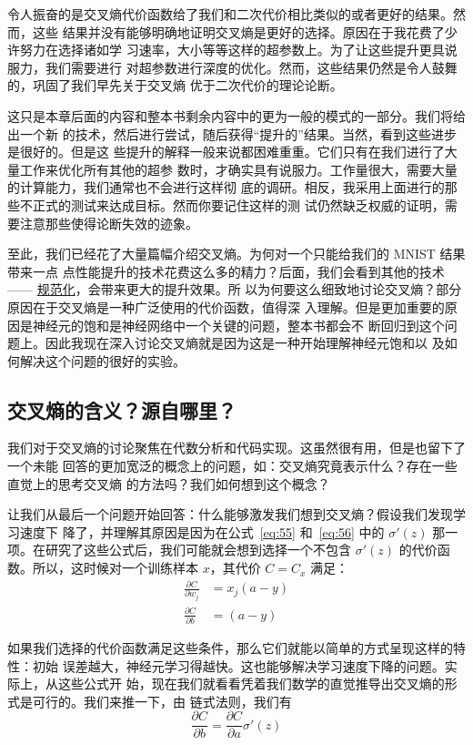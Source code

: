 令人振奋的是交叉熵代价函数给了我们和二次代价相比类似的或者更好的结果。然而，这些
结果并没有能够明确地证明交叉熵是更好的选择。原因在于我花费了少许努力在选择诸如学
习速率，\minibatch{}大小等等这样的超参数上。为了让这些提升更具说服力，我们需要进行
对超参数进行深度的优化。然而，这些结果仍然是令人鼓舞的，巩固了我们早先关于交叉熵
优于二次代价的理论论断。

这只是本章后面的内容和整本书剩余内容中的更为一般的模式的一部分。我们将给出一个新
的技术，然后进行尝试，随后获得“提升的”结果。当然，看到这些进步是很好的。但是这
些提升的解释一般来说都困难重重。它们只有在我们进行了大量工作来优化所有其他的超参
数时，才确实具有说服力。工作量很大，需要大量的计算能力，我们通常也不会进行这样彻
底的调研。相反，我采用上面进行的那些不正式的测试来达成目标。然而你要记住这样的测
试仍然缺乏权威的证明，需要注意那些使得论断失效的迹象。

至此，我们已经花了大量篇幅介绍交叉熵。为何对一个只能给我们的 MNIST 结果带来一点
点性能提升的技术花费这么多的精力？后面，我们会看到其他的技术 ——
\hyperref[sec:overfitting_and_regularization]{规范化}，会带来更大的提升效果。所
以为何要这么细致地讨论交叉熵？部分原因在于交叉熵是一种广泛使用的代价函数，值得深
入理解。但是更加重要的原因是神经元的饱和是神经网络中一个关键的问题，整本书都会不
断回归到这个问题上。因此我现在深入讨论交叉熵就是因为这是一种开始理解神经元饱和以
及如何解决这个问题的很好的实验。

\subsection{交叉熵的含义？源自哪里？}

我们对于交叉熵的讨论聚焦在代数分析和代码实现。这虽然很有用，但是也留下了一个未能
回答的更加宽泛的概念上的问题，如：交叉熵究竟表示什么？存在一些直觉上的思考交叉熵
的方法吗？我们如何想到这个概念？

让我们从最后一个问题开始回答：什么能够激发我们想到交叉熵？假设我们发现学习速度下
降了，并理解其原因是因为在公式~\eqref{eq:55} 和~\eqref{eq:56} 中的 $\sigma'(z)$
那一项。在研究了这些公式后，我们可能就会想到选择一个不包含 $\sigma'(z)$ 的代价函
数。所以，这时候对一个训练样本 $x$，其代价 $C = C_x$ 满足：
\begin{align}
  \frac{\partial C}{\partial w_j} &= x_j(a-y) \label{eq:71}\tag{71}\\
  \frac{\partial C}{\partial b } &= (a-y) \label{eq:72}\tag{72}
\end{align}

如果我们选择的代价函数满足这些条件，那么它们就能以简单的方式呈现这样的特性：初始
误差越大，神经元学习得越快。这也能够解决学习速度下降的问题。实际上，从这些公式开
始，现在我们就看看凭着我们数学的直觉推导出交叉熵的形式是可行的。我们来推一下，由
链式法则，我们有
\begin{equation}
  \frac{\partial C}{\partial b} = \frac{\partial C}{\partial a}
  \sigma'(z)
  \tag{73}
\end{equation}

